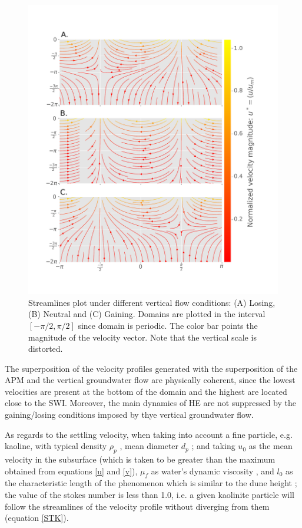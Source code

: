 \documentclass[draft,linenumbers]{agujournal2018}
\begin{document}
\begin{figure}[ht]
\centering
\includegraphics[width=35pc]
{190131_Streamlines.pdf}
\caption{Streamlines plot under different vertical flow conditions: (A) Losing, (B) Neutral and (C) Gaining. Domains are plotted in the interval $[-\pi /2, \pi/2]$ since domain is periodic. The color bar points the magnitude of the velocity vector. Note that the vertical scale is distorted.}
\label{Velocities}
\end{figure}

The superposition of the velocity profiles generated with the superposition of the APM and the vertical groundwater flow are physically coherent, since the lowest velocities are present at the bottom of the domain and the highest are located close to the SWI. Moreover, the main dynamics of HE are not suppressed by the gaining/losing conditions imposed by thye vertical groundwater flow.

As regards to the settling velocity, when taking into account a fine particle, e.g. kaoline, with typical density $\rho_p$ \citep{NationalCenterforBiotechnologyInformation}, mean diameter $d_p$ \citep{Fox2014}; and taking $u_0$ as the mean velocity in the subsurface (which is taken to be greater than the maximum obtained from equations \ref{u} and \ref{v}), $\mu_f$ as water's dynamic viscosity \citep{Cengel2006}, and $l_0$ as the characteristic length of the phenomenon which is similar to the dune height \citep{Fox2018}; the value of the stokes number is less than 1.0, i.e. a given kaolinite particle will follow the streamlines of the velocity profile without diverging from them \citep{Tropea2007} (equation \ref{STK}).
\end{document}

